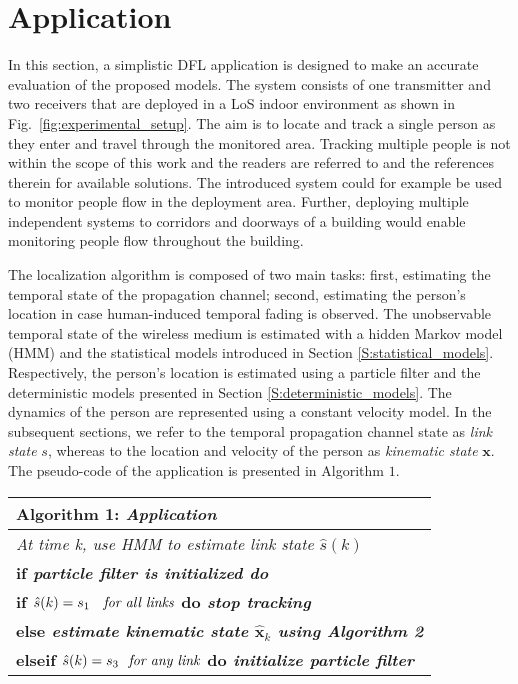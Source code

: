 \documentclass[journal, 10pt, twocolumn, balance]{IEEEtran}
\begin{document}
\section{Application} \label{S:application}
In this section, a simplistic DFL application is designed to make an accurate evaluation of the proposed models.  
The system consists of one transmitter and two receivers that are deployed in a LoS indoor environment as shown in Fig.~\ref{fig:experimental_setup}. The aim is to locate and track a single person as they enter and travel through the monitored area.  Tracking multiple people is not within the scope of this work and the readers are referred to \cite{bocca2013b} and the references therein for available solutions. The introduced system could for example be used to monitor people flow in the deployment area. Further, deploying multiple independent systems to corridors and doorways of a building would enable monitoring people flow throughout the building.


The localization algorithm is composed of two main tasks: first, estimating the temporal state of the propagation channel; second, estimating the person's location in case human-induced temporal fading is observed. The unobservable temporal state of the wireless medium is estimated with a hidden Markov model (HMM) and the statistical models introduced in Section \ref{S:statistical_models}. Respectively, the person's location is estimated using a particle filter and the deterministic models presented in Section \ref{S:deterministic_models}. The dynamics of the person are represented using a constant velocity model. In the subsequent sections, we refer to the temporal propagation channel state as \emph{link state} $s$, whereas to the location and velocity of the person as \emph{kinematic state} $\bm{x}$. The pseudo-code of the application is presented in Algorithm $1$.



\begin{center}
\renewcommand{\arraystretch}{1.2}\begin{tabular}{ l }
    \hline\hline
	\bf{Algorithm 1: } \it{Application} \\
    \hline
	\it{At time k, use HMM to estimate link state $\hat{s}(k)$} \\
	\bf{if} \it{particle filter is initialized} \bf{do} \\
		\quad \bf{if} $\hat{s}(k) = s_1 \; \text{ \it{ for all links}}$ \bf{do} \it{stop tracking} \\
		\quad \bf{else} \it{estimate kinematic state} $\bm{\hat{x}}_k$ \it{using} \bf{Algorithm 2}\\
	\bf{elseif} $\hat{s}(k) = s_3 \text{ \it{ for any link}}$ \bf{do} \it{initialize particle filter} \\
	\hline
  \end{tabular}
\end{center}
\end{document}
